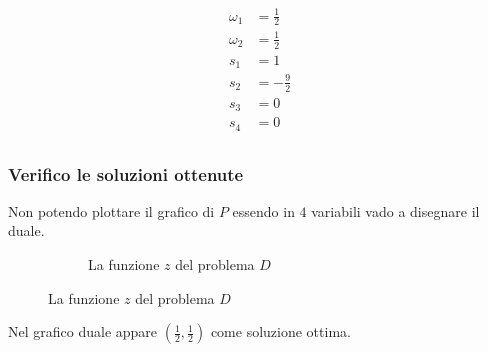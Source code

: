 \documentclass[\main/main.tex]{subfiles}
\begin{document}
\begin{align*}
  \omega_1 & = \frac{1}{2}  \\
  \omega_2 & = \frac{1}{2}  \\
  s_1      & = 1            \\
  s_2      & = -\frac{9}{2} \\
  s_3      & = 0            \\
  s_4      & = 0            \\
\end{align*}

\subsubsection*{Verifico le soluzioni ottenute}
Non potendo plottare il grafico di $P$ essendo in $4$ variabili vado a disegnare il duale.

\begin{figure}
  \begin{subfigure}{0.45\textwidth}
    \caption{La funzione $z$ del problema $D$}
  \end{subfigure}
\end{figure}

Nel grafico duale appare $(\frac{1}{2}, \frac{1}{2})$ come soluzione ottima.
\end{document}
